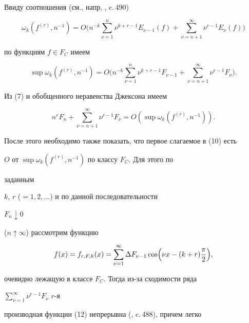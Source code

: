 \begin{pf} Ввиду соотношения (см., напр, \cite{Bar}, c.\,490)


\begin{equation}


\omega_k(f^{(r)},n^{-1})=O\biggl(n^{-k}\sum^n_{\nu=1}


\nu^{k+r-1}E_{\nu-1}(f)+\sum^\infty_{\nu=n+1}\nu^{r-1}E_\nu(f)


\biggr)


\end{equation}


по функциям $f\in F_C$ имеем


\begin{equation}


\sup\omega_k(f^{(r)},n^{-1})=O\biggl(n^{-k}\sum^n_{\nu=1}


\nu^{k+r-1}F_{\nu-1}+\sum^\infty_{\nu=n+1}\nu^{r-1}F_\nu\biggr).


\end{equation}


Из (7) и обобщенного неравенства Джексона имеем


\begin{equation}


n^rF_n+\sum^\infty_{\nu=n+1}\nu^{r-1}F_\nu=O(\sup\omega_k


(f^{(r)},n^{-1})).


\end{equation}


После этого необходимо также показать, что первое слагаемое в (10) есть


$O$ от $\sup\omega_k(f^{(r)},n^{-1})$ по классу $F_C$. Для этого по


заданным


$k$, $r$ ($=1,2,\dotsc$) и по данной последовательности


$F_n\downarrow 0$


($n\uparrow\infty$) рассмотрим функцию


\begin{equation}


f(x)=f_{r,F,k}(x)=\sum^\infty_{\nu=1}\Delta F_{\nu-1}


\cos\Bigl(\nu x-(k+r)\frac{\pi}{2}\Bigr),


\end{equation}


очевидно лежащую в классе $F_C$. Тогда из-за сходимости ряда


$\sum\limits^\infty_{\nu=1}\nu^{r-1}F_\nu$ $r$-я


производная функции (12) непрерывна (\cite{Bar}, c.\,488), причем легко



\end{pf}
